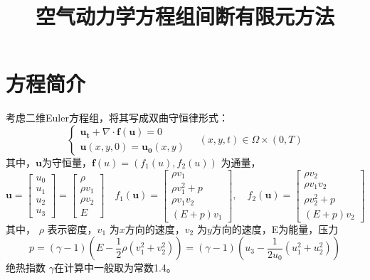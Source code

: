 \documentclass[a4paper, 12pt, UTF8]{ctexart}
\title{空气动力学方程组间断有限元方法}
\date{} %
\newcommand{\bs}[1]{\boldsymbol{#1}}
\begin{document}
\maketitle


\section{方程简介}
考虑二维Euler方程组，将其写成双曲守恒律形式：
\begin{equation}
 \begin{cases}
    	\bs {u_{t}}+\nabla \cdot \bs f(\bs u)=0 \\
    	\bs u(x, y, 0)=\bs{u_{0}}(x, y)
    \end{cases} \quad (x, y, t)  \in \Omega \times(0, T)
\end{equation}
其中，$\bs u$为守恒量，$\bs f(u)=\left(f_{1}(u), f_{2}(u)\right)$ 为通量，
\begin{equation}
\bs{u}=\begin{bmatrix}
	u_0\\
	u_{1}\\
	u_{2}\\
	 u_3
\end{bmatrix}
=\begin{bmatrix}
	\rho\\
	\rho v_{1}\\
	\rho v_{2}\\
	 E
\end{bmatrix}
\quad f_{1}(\bs{u})=\begin{bmatrix}
	\rho v_{1}\\
	\rho v_{1}^{2}+p\\
	\rho v_{1} v_{2}\\
	(E+p) v_{1}
\end{bmatrix},\quad
f_{2}(\bs{u})=\begin{bmatrix}
	\rho v_{2}\\
	 \rho v_{1} v_{2}\\
	 \rho v_{2}^{2}+p\\
	 (E+p) v_{2}
\end{bmatrix}
\end{equation}
其中， $\rho$ 表示密度，$v_{1}$ 为$x$方向的速度，$v_{2}$ 为$y$方向的速度，E为能量，压力 
\begin{equation}\label{pressure}
p=(\gamma-1)\left(E-\frac{1}{2} \rho\left(v_{1}^{2}+v_{2}^{2}\right)\right)=(\gamma-1)\left(u_3-\frac{1}{2u_0} \left(u_1^{2}+u_{2}^{2}\right)\right)
\end{equation}
绝热指数 $\gamma$在计算中一般取为常数1.4。
\end{document}
